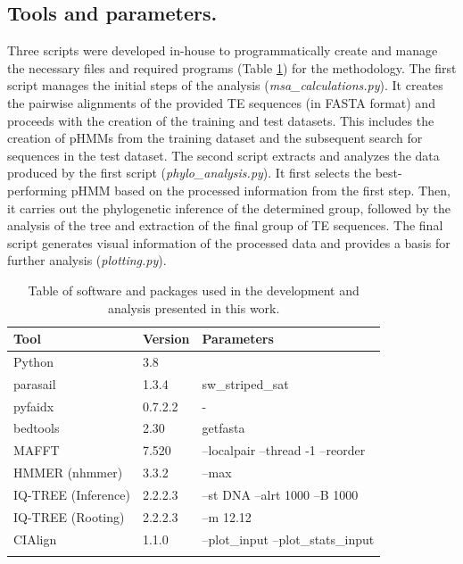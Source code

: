 \documentclass[unnumsec,webpdf,contemporary,large]{oup-authoring-template}%
\theoremstyle{thmstyleone}%
\theoremstyle{thmstyletwo}%
\theoremstyle{thmstylethree}%
\begin{document}
\subsection{Tools and parameters.}\label{subsec2_6}

Three scripts were developed in-house to programmatically create and manage the necessary files and required programs (Table \ref{table:tab1}) for the methodology. The first script manages the initial steps of the analysis (\textit{msa\_calculations.py}). It creates the pairwise alignments of the provided TE sequences (in FASTA format) and proceeds with the creation of the training and test datasets. This includes the creation of pHMMs from the training dataset and the subsequent search for sequences in the test dataset. The second script extracts and analyzes the data produced by the first script (\textit{phylo\_analysis.py}). It first selects the best-performing pHMM based on the processed information from the first step. Then, it carries out the phylogenetic inference of the determined group, followed by the analysis of the tree and extraction of the final group of TE sequences. The final script generates visual information of the processed data and provides a basis for further analysis (\textit{plotting.py}).

\begin{table}[!h]
\caption{Table of software and packages used in the development and analysis presented in this work.}
\label{table:tab1}
\tabcolsep=0pt%
\begin{tabularx}{\columnwidth}{@{\extracolsep{\fill}}lll@{\extracolsep{\fill}}}
\toprule
Tool & Version & Parameters \\
\midrule
Python & 3.8 &   \\
parasail & 1.3.4 & sw\_striped\_sat \\
pyfaidx \cite{shirley_efficient_2015} & 0.7.2.2 & - \\
bedtools \cite{quinlan_bedtools_2010} & 2.30 & getfasta \\
MAFFT & 7.520 & --localpair --thread -1 --reorder \\
HMMER (nhmmer) & 3.3.2 & --max \\
IQ-TREE (Inference) & 2.2.2.3 & --st DNA --alrt 1000 --B 1000 \\
IQ-TREE (Rooting) & 2.2.2.3 & --m 12.12 \\
CIAlign \cite{tumescheit_cialign_2022} & 1.1.0 &  --plot\_input --plot\_stats\_input \\
\botrule
\end{tabularx}
\end{table}
\end{document}
